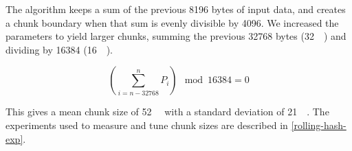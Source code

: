 The algorithm keeps a sum of the previous \num{8196} bytes of input data, and
creates a chunk boundary when that sum is evenly divisible by \num{4096}. We
increased the parameters to yield larger chunks, summing the previous
\num{32768} bytes (\SI{32}{\kibi\byte}) and dividing by \num{16384}
(\SI{16}{\kibi\relax}).

\begin{equation*}
    \left( \sum_{i = n - \num{32768} }^{n}{P_i} \right) \mod \num{16384} = 0
\end{equation*}

This gives a mean chunk size of \SI{52}{\kibi\byte} with a standard deviation of
\SI{21}{\kibi\byte}. The experiments used to measure and tune chunk sizes are
described in \autoref{rolling-hash-exp}.
